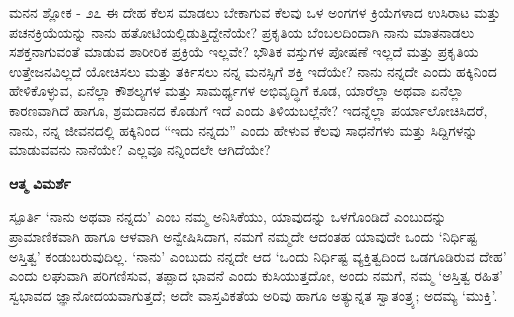 \begin{mananam}{\mananamfont \large ಮನನ ಶ್ಲೋಕ - ೨೭}
\mananamtext ಈ ದೇಹ ಕೆಲಸ ಮಾಡಲು ಬೇಕಾಗುವ ಕೆಲವು ಒಳ ಅಂಗಗಳ ಕ್ರಿಯೆಗಳಾದ ಉಸಿರಾಟ ಮತ್ತು ಪಚನಕ್ರಿಯೆಯನ್ನು ನಾನು ಹತೋಟಿಯಲ್ಲಿಡುತ್ತಿದ್ದೇನೆಯೇ? ಪ್ರಕೃತಿಯ ಬೆಂಬಲದಿಂದಾಗಿ ನಾನು ಮಾತನಾಡಲು ಸಶಕ್ತನಾಗುವಂತೆ ಮಾಡುವ ಶಾರೀರಿಕ ಪ್ರಕ್ರಿಯೆ ಇಲ್ಲವೇ? ಭೌತಿಕ ವಸ್ತುಗಳ ಪೋಷಣೆ ಇಲ್ಲದೆ ಮತ್ತು ಪ್ರಕೃತಿಯ ಉತ್ತೇಜನವಿಲ್ಲದೆ ಯೋಚಿಸಲು ಮತ್ತು ತರ್ಕಿಸಲು ನನ್ನ ಮನಸ್ಸಿಗೆ ಶಕ್ತಿ ಇದೆಯೇ? ನಾನು ನನ್ನದೇ ಎಂದು  ಹಕ್ಕಿನಿಂದ ಹೇಳಿಕೊಳ್ಳುವ, ಏನೆಲ್ಲಾ ಕೌಶಲ್ಯಗಳ ಮತ್ತು ಸಾಮರ್ಥ್ಯಗಳ ಅಭಿವೃದ್ಧಿಗೆ ಕೂಡ, ಯಾರೆಲ್ಲಾ ಅಥವಾ ಏನೆಲ್ಲಾ ಕಾರಣವಾಗಿದೆ ಹಾಗೂ, ಶ್ರಮದಾನದ ಕೊಡುಗೆ ಇದೆ ಎಂದು ತಿಳಿಯಬಲ್ಲೆನೇ? ಇದನ್ನೆಲ್ಲಾ ಪರ್ಯಾಲೋಚಿಸಿದರೆ, ನಾನು, ನನ್ನ ಜೀವನದಲ್ಲಿ ಹಕ್ಕಿನಿಂದ “ಇದು ನನ್ನದು” ಎಂದು ಹೇಳುವ ಕೆಲವು ಸಾಧನೆಗಳು ಮತ್ತು ಸಿದ್ದಿಗಳನ್ನು ಮಾಡುವವನು ನಾನೆಯೇ? ಎಲ್ಲವೂ ನನ್ನಿಂದಲೇ ಆಗಿದೆಯೇ?
\end{mananam}
\WritingHand\enspace\textbf{ಆತ್ಮ ವಿಮರ್ಶೆ}\\
\begin{inspiration}{\mananamfont \large ಸ್ಪೂರ್ತಿ}
\mananamtext ‘ನಾನು ಅಥವಾ ನನ್ನದು’ ಎಂಬ ನಮ್ಮ ಅನಿಸಿಕೆಯು, ಯಾವುದನ್ನು ಒಳಗೊಂಡಿದೆ ಎಂಬುದನ್ನು ಪ್ರಾಮಾಣಿಕವಾಗಿ ಹಾಗೂ ಆಳವಾಗಿ ಅನ್ವೇಷಿಸಿದಾಗ, ನಮಗೆ ನಮ್ಮದೇ ಆದಂತಹ ಯಾವುದೇ ಒಂದು ‘ನಿರ್ಧಿಷ್ಟ  ಅಸ್ತಿತ್ವ’ ಕಂಡುಬರುವುದಿಲ್ಲ. ‘ನಾನು’ ಎಂಬುದು ನನ್ನದೇ ಆದ ‘ಒಂದು ನಿರ್ಧಿಷ್ಟ ವ್ಯಕ್ತಿತ್ವದಿಂದ ಒಡಗೂಡಿರುವ  ದೇಹ’ ಎಂದು ಲಘುವಾಗಿ ಪರಿಗಣಿಸುವ, ತಪ್ಪಾದ ಭಾವನೆ ಎಂದು ಕುಸಿಯುತ್ತದೋ, ಅಂದು ನಮಗೆ, ನಮ್ಮ ‘ಅಸ್ತಿತ್ವ ರಹಿತ’ ಸ್ವಭಾವದ ಜ್ಞಾನೋದಯವಾಗುತ್ತದೆ; ಅದೇ ವಾಸ್ತವಿಕತೆಯ ಅರಿವು ಹಾಗೂ ಅತ್ಯುನ್ನತ ಸ್ವಾತಂತ್ರ್ಯ; ಅದಮ್ಯ ‘ಮುಕ್ತಿ’.
\end{inspiration}
\newpage

